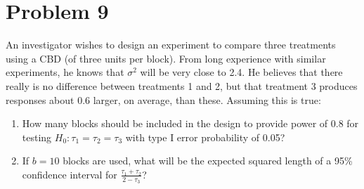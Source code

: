 \documentclass{article}
\begin{document}
\section{Problem 9}
An investigator wishes to design an experiment to compare three treatments using a CBD (of three
units per block). From long experience with similar experiments, he knows that $\sigma^2$ will be very
close to 2.4. He believes that there really is no difference between treatments 1 and 2, but that
treatment 3 produces responses about 0.6 larger, on average, than these. Assuming this is true:

\begin{enumerate}
	\item How many blocks should be included in the design to provide power of 0.8 for testing
	      $H_0: \tau_1 = \tau_2 = \tau_3$ with type I error probability of 0.05?
	\item If $b=10$ blocks are used, what will be the expected squared length of a 95\% confidence interval
	      for $\frac{\tau_1 + \tau_2}{2-\tau_3}$?
\end{enumerate}
\end{document}
